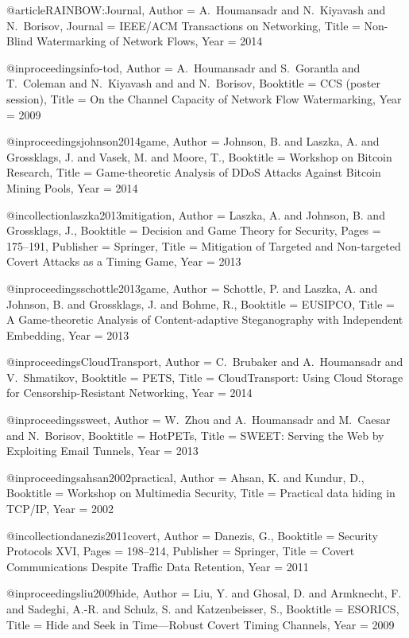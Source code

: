 {{{{{{{{{@article{RAINBOW:Journal,
	Author = {A.~Houmansadr and N.~Kiyavash and N.~Borisov},
	Journal = {IEEE/ACM Transactions on Networking},
	Title = {{Non-Blind Watermarking of Network Flows}},
	Year = 2014}

@inproceedings{info-tod,
	Author = {A.~Houmansadr and S.~Gorantla and T.~Coleman and N.~Kiyavash and and N.~Borisov},
	Booktitle = {{CCS (poster session)}},
	Title = {{On the Channel Capacity of Network Flow Watermarking}},
	Year = {2009}}

@inproceedings{johnson2014game,
	Author = {Johnson, B. and Laszka, A. and Grossklags, J. and Vasek, M. and Moore, T.},
	Booktitle = {Workshop on Bitcoin Research},
	Title = {{Game-theoretic Analysis of DDoS Attacks Against Bitcoin Mining Pools}},
	Year = {2014}}

@incollection{laszka2013mitigation,
	Author = {Laszka, A. and Johnson, B. and Grossklags, J.},
	Booktitle = {Decision and Game Theory for Security},
	Pages = {175--191},
	Publisher = {Springer},
	Title = {{Mitigation of Targeted and Non-targeted Covert Attacks as a Timing Game}},
	Year = {2013}}

@inproceedings{schottle2013game,
	Author = {Schottle, P. and Laszka, A. and Johnson, B. and Grossklags, J. and Bohme, R.},
	Booktitle = {EUSIPCO},
	Title = {{A Game-theoretic Analysis of Content-adaptive Steganography with Independent Embedding}},
	Year = {2013}}

@inproceedings{CloudTransport,
	Author = {C.~Brubaker and A.~Houmansadr and V.~Shmatikov},
	Booktitle = {PETS},
	Title = {{CloudTransport: Using Cloud Storage for Censorship-Resistant Networking}},
	Year = {2014}}

@inproceedings{sweet,
	Author = {W.~Zhou and A.~Houmansadr and M.~Caesar and N.~Borisov},
	Booktitle = {HotPETs},
	Title = {{SWEET: Serving the Web by Exploiting Email Tunnels}},
	Year = {2013}}

@inproceedings{ahsan2002practical,
	Author = {Ahsan, K. and Kundur, D.},
	Booktitle = {Workshop on Multimedia Security},
	Title = {{Practical data hiding in TCP/IP}},
	Year = {2002}}

@incollection{danezis2011covert,
	Author = {Danezis, G.},
	Booktitle = {Security Protocols XVI},
	Pages = {198--214},
	Publisher = {Springer},
	Title = {{Covert Communications Despite Traffic Data Retention}},
	Year = {2011}}

@inproceedings{liu2009hide,
	Author = {Liu, Y. and Ghosal, D. and Armknecht, F. and Sadeghi, A.-R. and Schulz, S. and Katzenbeisser, S.},
	Booktitle = {ESORICS},
	Title = {{Hide and Seek in Time---Robust Covert Timing Channels}},
	Year = {2009}}

}}}}}}}}}
